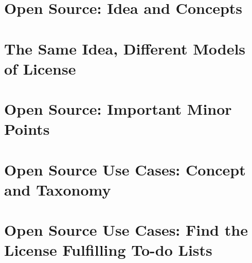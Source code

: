\documentclass[DIV=calc,BCOR=5mm,12pt,headings=small,oneside,abstract=true,
toc=bib]{scrbook}
\begin{document}



%  


% 

% 
%

\chapter{Open Source: Idea and Concepts}






\chapter{The Same Idea, Different Models of License}



\chapter{Open Source: Important Minor Points}







\chapter{Open Source Use Cases: Concept and Taxonomy}




\chapter{Open Source Use Cases: Find the License Fulfilling To-do Lists}


\end{document}
